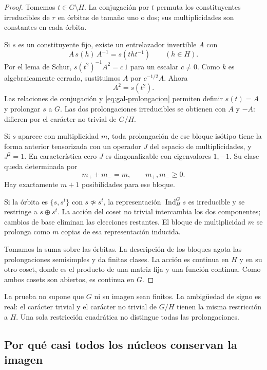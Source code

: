 \begin{proof}
Tomemos $t\in G\setminus H$. La conjugación por $t$ permuta los
constituyentes irreducibles de $r$ en órbitas de tamaño uno o dos;
sus multiplicidades son constantes en cada órbita.

Si $s$ es un constituyente fijo, existe un entrelazador invertible
$A$ con
\[
 A\,s(h)\,A^{-1}=s(tht^{-1})\qquad(h\in H).
\]
Por el lema de Schur, $s(t^2)^{-1}A^2=c\,1$ para un escalar
$c\ne0$. Como $k$ es algebraicamente cerrado, sustituimos $A$
por $c^{-1/2}A$. Ahora
\begin{equation}
 A^2=s(t^2).
 \label{eq:gal-prolongacion}
\end{equation}
Las relaciones de conjugación y \eqref{eq:gal-prolongacion}
permiten definir $s(t)=A$ y prolongar $s$ a $G$.
Las dos prolongaciones irreducibles se obtienen con $A$ y $-A$:
difieren por el carácter no trivial de $G/H$.

Si $s$ aparece con multiplicidad $m$, toda prolongación de ese
bloque isótipo tiene la forma anterior tensorizada con un operador
$J$ del espacio de multiplicidades, y $J^2=1$.
En característica cero $J$ es diagonalizable con eigenvalores
$1,-1$. Su clase queda determinada por
\begin{equation}
 m_++m_-=m,\qquad m_+,m_-\ge0.
 \label{eq:gal-elecciones}
\end{equation}
Hay exactamente $m+1$ posibilidades para ese bloque.

Si la órbita es $\{s,s^t\}$ con $s\not\simeq s^t$,
la representación $\operatorname{Ind}_H^G s$ es irreducible
y se restringe a $s\oplus s^t$.
La acción del coset no trivial intercambia los dos componentes;
cambios de base eliminan las elecciones restantes.
El bloque de multiplicidad $m$ se prolonga como $m$ copias
de esa representación inducida.

Tomamos la suma sobre las órbitas.
La descripción de los bloques agota las prolongaciones
semisimples y da finitas clases.
La acción es continua en $H$ y en su otro coset, donde es
el producto de una matriz fija y una función continua.
Como ambos cosets son abiertos, es continua en $G$.
\end{proof}

La prueba no supone que $G$ ni su imagen sean finitos.
La ambigüedad de signo es real: el carácter trivial y el carácter
no trivial de $G/H$ tienen la misma restricción a $H$.
Una sola restricción cuadrática no distingue todas las
prolongaciones.

\subsection{Por qué casi todos los núcleos conservan la imagen}

